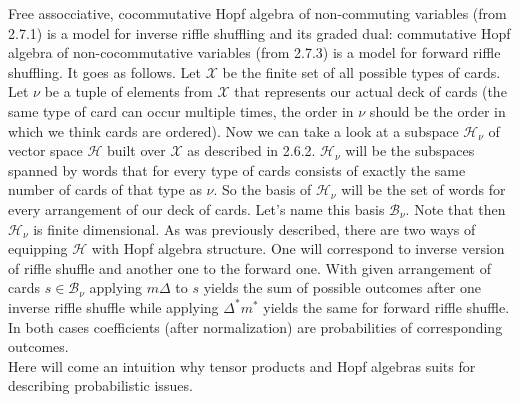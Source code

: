 \documentclass[a4paper]{article}
\begin{document}
Free assocciative, cocommutative Hopf algebra of non-commuting variables (from 2.7.1) is a model for inverse
riffle shuffling and its graded dual: commutative
Hopf algebra of non-cocommutative variables (from 2.7.3) is a model for forward riffle shuffling.
It goes as follows.
Let $\mathcal{X}$ be the finite set of all possible types of cards. Let $\nu$ be a tuple of
elements from $\mathcal{X}$ that represents our actual deck of cards (the same type of card can occur
multiple times, the order in $\nu$ should be the order in which we think cards are ordered). Now we can
take a look at a subspace $\mathcal{H}_\nu$ of vector space $\mathcal{H}$ built over $\mathcal{X}$ as
described in 2.6.2. $\mathcal{H}_\nu$ will be the subspaces spanned by words that for every type of cards
consists of exactly the same number of cards of that type as $\nu$. So the basis of $\mathcal{H}_\nu$ will
be the set
of words for every arrangement of our deck of cards. Let's name this basis $\mathcal{B}_\nu$. Note that then
$\mathcal{H}_\nu$ is finite dimensional. As was previously described, there are two ways of equipping
$\mathcal{H}$ with Hopf algebra structure. One will correspond to inverse version of riffle shuffle and
another one to the forward one. With given arrangement of cards $s \in \mathcal{B}_\nu$ applying $m\Delta$ to
$s$ yields the sum of possible outcomes after one inverse riffle shuffle while applying $\Delta^*m^*$
yields the same for forward riffle shuffle. In both cases coefficients (after normalization) are
probabilities of corresponding outcomes. \\[4pt]

Here will come an intuition why tensor products and Hopf algebras suits for describing probabilistic issues.
\end{document}

